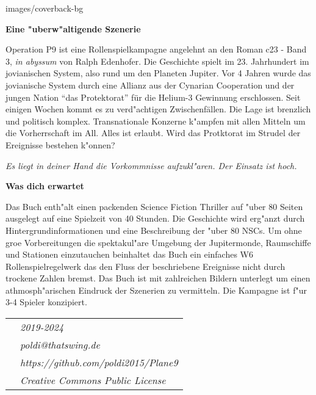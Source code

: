 \begin{backcover}{images/coverback-bg}

    \vspace{5mm}
    \textbf{Eine "uberw"altigende Szenerie}

    Operation P9 ist eine Rollenspielkampagne angelehnt an den Roman c23 - Band 3, \textit{in abyssum} von Ralph Edenhofer. Die Geschichte spielt im 23. Jahrhundert im jovianischen System, also rund um den Planeten Jupiter. Vor 4 Jahren wurde das jovianische System durch eine Allianz aus der Cynarian Cooperation und der jungen Nation "`das Protektorat"' für die Helium-3 Gewinnung erschlossen. Seit einigen Wochen kommt es zu verd"achtigen Zwischenfällen. Die Lage ist brenzlich und politisch komplex. Transnationale Konzerne k"ampfen mit allen Mitteln um die Vorherrschaft im All. Alles ist erlaubt. Wird das Protktorat im Strudel der Ereignisse bestehen k"onnen?

    \medskip
    \emph{Es liegt in deiner Hand die Vorkommnisse aufzukl"aren. Der Einsatz ist hoch.}

    \vspace{5mm}
    \textbf{Was dich erwartet}

    Das Buch enth"alt einen packenden Science Fiction Thriller auf "uber 80 Seiten ausgelegt auf eine Spielzeit von 40 Stunden. Die Geschichte wird erg"anzt durch Hintergrundinformationen und eine Beschreibung der "uber 80 NSCs. Um ohne gro\3e Vorbereitungen die spektakul"are Umgebung der Jupitermonde, Raumschiffe und Stationen einzutauchen beinhaltet das Buch ein einfaches W6 Rollenspielregelwerk das den Fluss der beschriebene Ereignisse nicht durch trockene Zahlen bremst. Das Buch ist mit zahlreichen Bildern unterlegt um einen athmosph"arischen Eindruck der Szenerien zu vermitteln. Die Kampagne ist f"ur 3-4 Spieler konzipiert.

    \vspace{15mm}
    \newcommand{\footerentry}[1]{\textit{\normalsize{}{#1}}}
    \begin{tabularx}{\textwidth} {
        >{\raggedright\arraybackslash}X
        >{\raggedleft\arraybackslash}X
    }
        & \footerentry{2019-2024} \\
        & \footerentry{poldi@thatswing.de}\\
        & \footerentry{https://github.com/poldi2015/Plane9}\\
        & \footerentry{Creative Commons Public License} 
    \end{tabularx}

\end{backcover}

